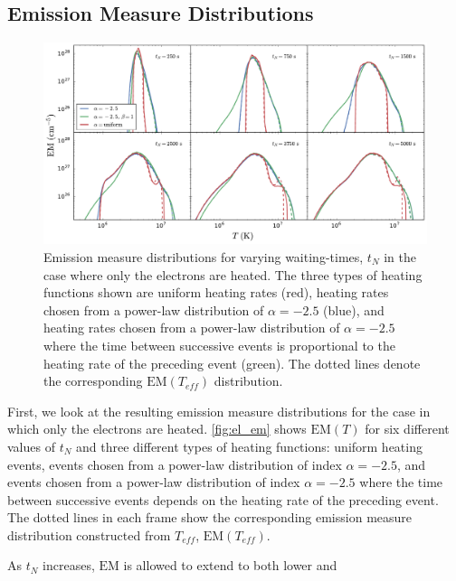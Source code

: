 \documentclass[apj]{emulateapj}
\begin{document}
	\subsection{Emission Measure Distributions}
	\label{subsec:em_dist}
	\begin{figure}[t]
		\centering
		\includegraphics[width=2\columnwidth]{figures/em_grid_electron_a25.pdf}
		\caption{Emission measure distributions for varying waiting-times, $t_N$ in the case where only the electrons are heated. The three types of heating functions shown are uniform heating rates (red), heating rates chosen from a power-law distribution of $\alpha=-2.5$ (blue), and heating rates chosen from a power-law distribution of $\alpha=-2.5$ where the time between successive events is proportional to the heating rate of the preceding event (green). The dotted lines denote the corresponding $\mathrm{EM}(T_{eff})$ distribution.}
		\label{fig:el_em}
	\end{figure}
	\par First, we look at the resulting emission measure distributions for the case in which only the electrons are heated. \autoref{fig:el_em} shows $\mathrm{EM}(T)$ for six different values of $t_N$ and three different types of heating functions: uniform heating events, events chosen from a power-law distribution of index $\alpha=-2.5$, and events chosen from a power-law distribution of index $\alpha=-2.5$ where the time between successive events depends on the heating rate of the preceding event. The dotted lines in each frame show the corresponding emission measure distribution constructed from $T_{eff}$, $\mathrm{EM}(T_{eff})$.
	\par As $t_N$ increases, $\mathrm{EM}$ is allowed to extend to both lower and 
\end{document}
